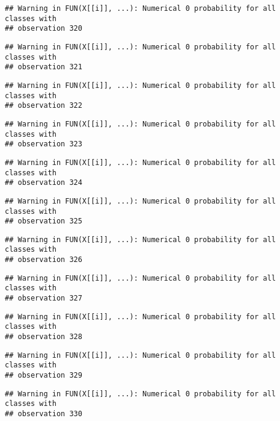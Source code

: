 \documentclass[
]{article}
\begin{document}
\begin{verbatim}
## Warning in FUN(X[[i]], ...): Numerical 0 probability for all classes with
## observation 320
\end{verbatim}

\begin{verbatim}
## Warning in FUN(X[[i]], ...): Numerical 0 probability for all classes with
## observation 321
\end{verbatim}

\begin{verbatim}
## Warning in FUN(X[[i]], ...): Numerical 0 probability for all classes with
## observation 322
\end{verbatim}

\begin{verbatim}
## Warning in FUN(X[[i]], ...): Numerical 0 probability for all classes with
## observation 323
\end{verbatim}

\begin{verbatim}
## Warning in FUN(X[[i]], ...): Numerical 0 probability for all classes with
## observation 324
\end{verbatim}

\begin{verbatim}
## Warning in FUN(X[[i]], ...): Numerical 0 probability for all classes with
## observation 325
\end{verbatim}

\begin{verbatim}
## Warning in FUN(X[[i]], ...): Numerical 0 probability for all classes with
## observation 326
\end{verbatim}

\begin{verbatim}
## Warning in FUN(X[[i]], ...): Numerical 0 probability for all classes with
## observation 327
\end{verbatim}

\begin{verbatim}
## Warning in FUN(X[[i]], ...): Numerical 0 probability for all classes with
## observation 328
\end{verbatim}

\begin{verbatim}
## Warning in FUN(X[[i]], ...): Numerical 0 probability for all classes with
## observation 329
\end{verbatim}

\begin{verbatim}
## Warning in FUN(X[[i]], ...): Numerical 0 probability for all classes with
## observation 330
\end{verbatim}
\end{document}
